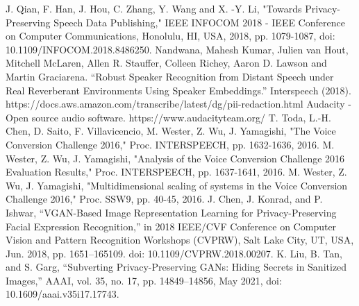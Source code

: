 \documentclass[journal]{IEEEtran} %
\begin{document}
\begin{thebibliography}{00}
     J. Qian, F. Han, J. Hou, C. Zhang, Y. Wang and X. -Y. Li, "Towards Privacy-Preserving Speech Data Publishing," IEEE INFOCOM 2018 - IEEE Conference on Computer Communications, Honolulu, HI, USA, 2018, pp. 1079-1087, doi: 10.1109/INFOCOM.2018.8486250.
     Nandwana, Mahesh Kumar, Julien van Hout, Mitchell McLaren, Allen R. Stauffer, Colleen Richey, Aaron D. Lawson and Martin Graciarena. “Robust Speaker Recognition from Distant Speech under Real Reverberant Environments Using Speaker Embeddings.” Interspeech (2018).
     https://docs.aws.amazon.com/transcribe/latest/dg/pii-redaction.html
     Audacity - Open source audio software. https://www.audacityteam.org/
     T. Toda, L.-H. Chen, D. Saito, F. Villavicencio, M. Wester, Z. Wu, J. Yamagishi, "The Voice Conversion Challenge 2016," Proc. INTERSPEECH, pp. 1632-1636, 2016.
     M. Wester, Z. Wu, J. Yamagishi, "Analysis of the Voice Conversion Challenge 2016 Evaluation Results," Proc. INTERSPEECH, pp. 1637-1641, 2016.
     M. Wester, Z. Wu, J. Yamagishi, "Multidimensional scaling of systems in the Voice Conversion Challenge 2016," Proc. SSW9, pp. 40-45, 2016.
     J. Chen, J. Konrad, and P. Ishwar, “VGAN-Based Image Representation Learning for Privacy-Preserving Facial Expression Recognition,” in 2018 IEEE/CVF Conference on Computer Vision and Pattern Recognition Workshops (CVPRW), Salt Lake City, UT, USA, Jun. 2018, pp. 1651–165109. doi: 10.1109/CVPRW.2018.00207.
     K. Liu, B. Tan, and S. Garg, “Subverting Privacy-Preserving GANs: Hiding Secrets in Sanitized Images,” AAAI, vol. 35, no. 17, pp. 14849–14856, May 2021, doi: 10.1609/aaai.v35i17.17743.
\end{thebibliography}
\end{document}
